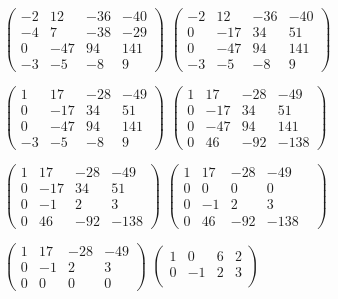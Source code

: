 \documentclass[10pt]{article}
\begin{document}
\begin{figure}[H]
\text{ = }
$\begin{pmatrix}
	-2 & 12 & -36 & -40 \\
	-4 & 7 & -38 & -29  \\
	0 & -47 & 94 & 141 \\
	-3 & -5 & -8 & 9
\end{pmatrix}$
\text{ = }
$\begin{pmatrix}
	-2 & 12 & -36 & -40 \\
	0 & -17 & 34 & 51  \\
	0 & -47 & 94 & 141 \\
	-3 & -5 & -8 & 9
\end{pmatrix}$
\text{ = }

\text{ = }
$\begin{pmatrix}
	1 & 17 & -28 & -49 \\
	0 & -17 & 34 & 51  \\
	0 & -47 & 94 & 141 \\
	-3 & -5 & -8 & 9
\end{pmatrix}$
\text{ = }
$\begin{pmatrix}
	1 & 17 & -28 & -49 \\
	0 & -17 & 34 & 51  \\
	0 & -47 & 94 & 141 \\
	0 & 46 & -92 & -138
\end{pmatrix}$
\text{ = }

\text{ = }
$\begin{pmatrix}
1 & 17 & -28 & -49 \\
0 & -17 & 34 & 51  \\
0 & -1 & 2 & 3 \\
0 & 46 & -92 & -138
\end{pmatrix}$
\text{ = }
$\begin{pmatrix}
1 & 17 & -28 & -49 \\
0 & 0 & 0 & 0 &  \\
0 & -1 & 2 & 3 \\
0 & 46 & -92 & -138
\end{pmatrix}$
\text{ = }

\text{ = }
$\begin{pmatrix}
1 & 17 & -28 & -49 \\
0 & -1 & 2 & 3 \\
0 & 0 & 0 & 0
\end{pmatrix}$
\text{ = }
$\begin{pmatrix}
1 & 0 & 6 & 2 \\
0 & -1 & 2 & 3 \\
\end{pmatrix}$ 
\end{figure}
\end{document}
